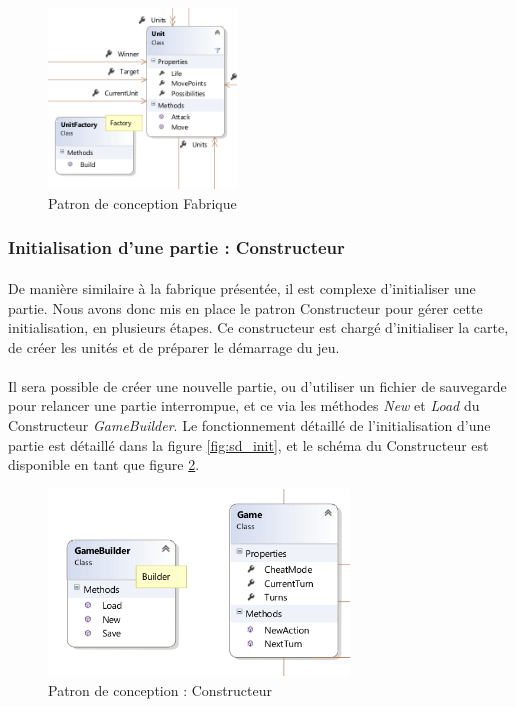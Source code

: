 \begin{figure}
  \centering
  \includegraphics[width=5cm]{schemas/dp_factory.png}
  \caption{Patron de conception Fabrique}
  \label{fig:factory}
\end{figure}

\subsubsection{Initialisation d'une partie : Constructeur}

\paragraph{}
De manière similaire à la fabrique présentée, il est complexe d'initialiser une partie.
Nous avons donc mis en place le patron Constructeur pour gérer cette initialisation, en plusieurs étapes.
Ce constructeur est chargé d'initialiser la carte, de créer les unités et de préparer le démarrage du jeu.

\paragraph{}
Il sera possible de créer une nouvelle partie, ou d'utiliser un fichier de sauvegarde pour relancer une partie interrompue, et ce via les méthodes \emph{New} et \emph{Load} du Constructeur \emph{GameBuilder}.
Le fonctionnement détaillé de l'initialisation d'une partie est détaillé dans la figure \ref{fig:sd_init}, et le schéma du Constructeur est disponible en tant que figure \ref{fig:builder}.

\begin{figure}
  \centering
  \includegraphics[width=8cm]{schemas/dp_builder.png}
  \caption{Patron de conception : Constructeur}
  \label{fig:builder}
\end{figure}

